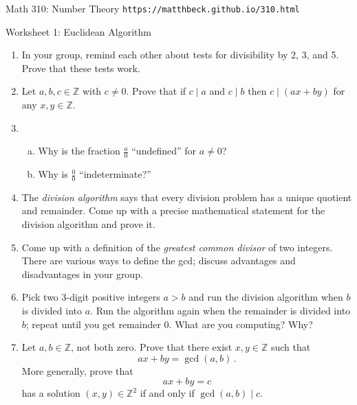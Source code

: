 \documentclass[11pt]{article}
\def\Z{\mathbb{Z}}
\begin{document}
\setlength{\parindent}{0pt}
\setlength{\parskip}{0.2cm}

$\mbox{}$
\vspace{-1in}

{ Math 310: Number Theory}
\hfill
{\tt https://matthbeck.github.io/310.html}

\vspace{.3in}




\begin{center}
\Large{Worksheet 1: Euclidean Algorithm}
\end{center}

\begin{enumerate}

\item In your group, remind each other about tests for divisibility by 2, 3, and 5.
Prove that these tests work.

\item Let $a, b, c \in \Z$ with $c \ne 0$.
Prove that if $c \mid a$ and $c \mid b$ then $c \mid (ax+by)$ for any $x, y \in \Z$.

\item
\begin{enumerate}[(a)]
  \item Why is the fraction $\frac{a}{0}$ ``undefined'' for $a \ne 0$?
  \item Why is $\frac{0}{0}$ ``indeterminate?''
\end{enumerate}

\item The \emph{division algorithm} says that every division problem has a unique quotient and remainder.
Come up with a precise mathematical statement for the division algorithm and prove it.

\item Come up with a definition of the \emph{greatest common divisor} of two integers.
There are various ways to define the gcd; discuss advantages and disadvantages in your group.

\item Pick two 3-digit positive integers $a > b$ and run the division algorithm when $b$ is divided into $a$.
Run the algorithm again when the remainder is divided into $b$; repeat until you get remainder 0.
What are you computing? Why?

\item Let $a, b \in \Z$, not both zero.
Prove that there exist $x, y \in \Z$ such that
\[
  ax+by = \gcd(a,b) \, .
\]
More generally, prove that
\[
  ax+by = c
\]
has a solution $(x,y) \in \Z^2$ if and only if $\gcd(a,b) \mid c$.


\end{enumerate}
\end{document}
